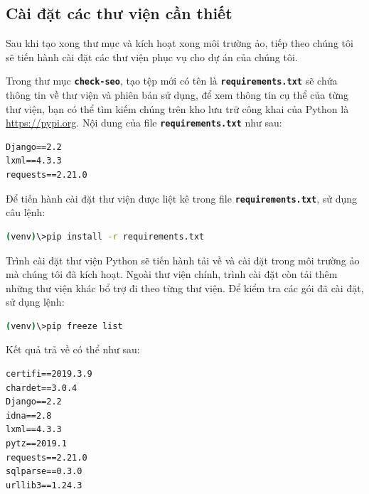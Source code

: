 \subsection{Cài đặt các thư viện cần thiết}
Sau khi tạo xong thư mục và kích hoạt xong môi trường ảo, tiếp theo chúng tôi sẽ tiến hành cài đặt các thư viện phục vụ cho dự án của chúng tôi.
\par
Trong thư mục \textbf{\texttt{check-seo}}, tạo tệp mới có tên là \textbf{\texttt{requirements.txt}} sẽ chứa thông tin về thư viện và phiên bản sử dụng, để xem thông tin cụ thể của từng thư viện, bạn có thể tìm kiếm chúng trên kho lưu trữ công khai của Python là \url{https://pypi.org}. Nội dung của file \textbf{\texttt{requirements.txt}} như sau:
\begin{lstlisting}
Django==2.2
lxml==4.3.3
requests==2.21.0
\end{lstlisting}
\par
Để tiến hành cài đặt thư viện được liệt kê trong file \textbf{\texttt{requirements.txt}}, sử dụng câu lệnh:
\begin{lstlisting}[language=bash]
(venv)\>pip install -r requirements.txt
\end{lstlisting}
\par
Trình cài đặt thư viện Python sẽ tiến hành tải về và cài đặt trong môi trường ảo mà chúng tôi đã kích hoạt. Ngoài thư viện chính, trình cài đặt còn tải thêm những thư viện khác bổ trợ đi theo từng thư viện. Để kiểm tra các gói đã cài đặt, sử dụng lệnh:
\begin{lstlisting}[language=bash]
(venv)\>pip freeze list
\end{lstlisting}
\par
Kết quả trả về có thể như sau:
\begin{lstlisting}
certifi==2019.3.9
chardet==3.0.4
Django==2.2
idna==2.8
lxml==4.3.3
pytz==2019.1
requests==2.21.0
sqlparse==0.3.0
urllib3==1.24.3
\end{lstlisting}
